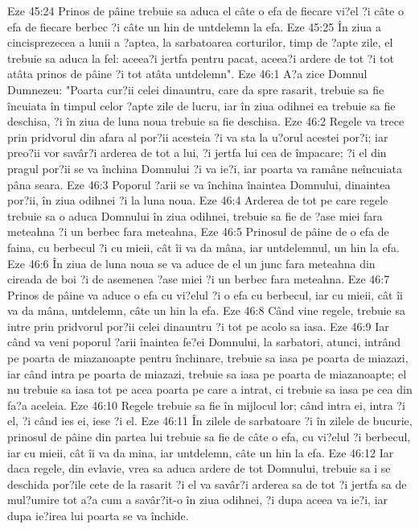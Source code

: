 Eze 45:24  Prinos de pâine trebuie sa aduca el câte o efa de fiecare vi?el ?i câte o efa de fiecare berbec ?i câte un hin de untdelemn la efa.
Eze 45:25  În ziua a cincisprezecea a lunii a ?aptea, la sarbatoarea corturilor, timp de ?apte zile, el trebuie sa aduca la fel: aceea?i jertfa pentru pacat, aceea?i ardere de tot ?i tot atâta prinos de pâine ?i tot atâta untdelemn".
Eze 46:1  A?a zice Domnul Dumnezeu: "Poarta cur?ii celei dinauntru, care da spre rasarit, trebuie sa fie încuiata în timpul celor ?apte zile de lucru, iar în ziua odihnei ea trebuie sa fie deschisa, ?i în ziua de luna noua trebuie sa fie deschisa.
Eze 46:2  Regele va trece prin pridvorul din afara al por?ii acesteia ?i va sta la u?orul acestei por?i; iar preo?ii vor savâr?i arderea de tot a lui, ?i jertfa lui cea de împacare; ?i el din pragul por?ii se va închina Domnului ?i va ie?i, iar poarta va ramâne neîncuiata pâna seara.
Eze 46:3  Poporul ?arii se va închina înaintea Domnului, dinaintea por?ii, în ziua odihnei ?i la luna noua.
Eze 46:4  Arderea de tot pe care regele trebuie sa o aduca Domnului în ziua odihnei, trebuie sa fie de ?ase miei fara meteahna ?i un berbec fara meteahna,
Eze 46:5  Prinosul de pâine de o efa de faina, cu berbecul ?i cu mieii, cât îi va da mâna, iar untdelemnul, un hin la efa.
Eze 46:6  În ziua de luna noua se va aduce de el un junc fara meteahna din cireada de boi ?i de asemenea ?ase miei ?i un berbec fara meteahna.
Eze 46:7  Prinos de pâine va aduce o efa cu vi?elul ?i o efa cu berbecul, iar cu mieii, cât îi va da mâna, untdelemn, câte un hin la efa.
Eze 46:8  Când vine regele, trebuie sa intre prin pridvorul por?ii celei dinauntru ?i tot pe acolo sa iasa.
Eze 46:9  Iar când va veni poporul ?arii înaintea fe?ei Domnului, la sarbatori, atunci, intrând pe poarta de miazanoapte pentru închinare, trebuie sa iasa pe poarta de miazazi, iar când intra pe poarta de miazazi, trebuie sa iasa pe poarta de miazanoapte; el nu trebuie sa iasa tot pe acea poarta pe care a intrat, ci trebuie sa iasa pe cea din fa?a aceleia.
Eze 46:10  Regele trebuie sa fie în mijlocul lor; când intra ei, intra ?i el, ?i când ies ei, iese ?i el.
Eze 46:11  În zilele de sarbatoare ?i în zilele de bucurie, prinosul de pâine din partea lui trebuie sa fie de câte o efa, cu vi?elul ?i berbecul, iar cu mieii, cât îi va da mina, iar untdelemn, câte un hin la efa.
Eze 46:12  Iar daca regele, din evlavie, vrea sa aduca ardere de tot Domnului, trebuie sa i se deschida por?ile cete de la rasarit ?i el va savâr?i arderea sa de tot ?i jertfa sa de mul?umire tot a?a cum a savâr?it-o în ziua odihnei, ?i dupa aceea va ie?i, iar dupa ie?irea lui poarta se va închide.

